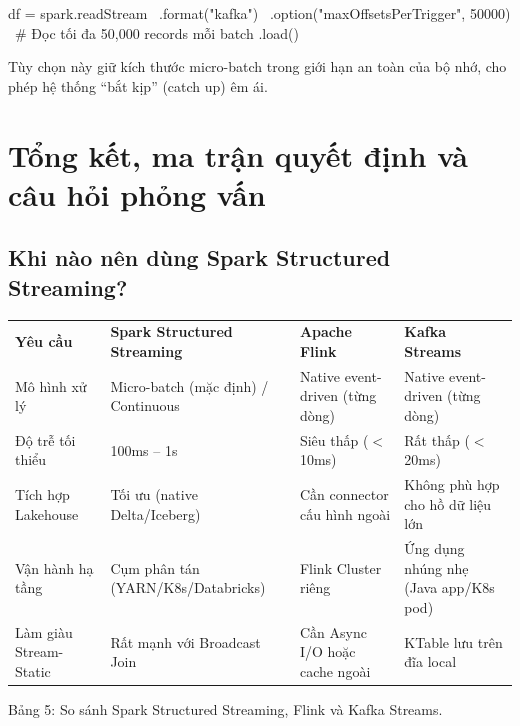 \documentclass[12pt]{article}
\begin{document}
\begin{aivnpybox}[maxOffsetsPerTrigger]
df = spark.readStream \
    .format("kafka") \
    .option("maxOffsetsPerTrigger", 50000) \  # Đọc tối đa 50,000 records mỗi batch
    .load()
\end{aivnpybox}

Tùy chọn này giữ kích thước micro-batch trong giới hạn an toàn của bộ nhớ, cho phép hệ thống ``bắt kịp'' (catch up) êm ái.

\section{Tổng kết, ma trận quyết định và câu hỏi phỏng vấn}

\subsection{Khi nào nên dùng Spark Structured Streaming?}

\noindent
\begin{longtable}{@{}>{\RaggedRight\arraybackslash}p{3.0cm}>{\RaggedRight\arraybackslash}p{4.4cm}>{\RaggedRight\arraybackslash}p{4.0cm}>{\RaggedRight\arraybackslash}p{4.2cm}@{}}
\rowcolor{rowLavender}
\textbf{Yêu cầu} & \textbf{Spark Structured Streaming} & \textbf{Apache Flink} & \textbf{Kafka Streams} \\
\addlinespace[3pt]
\endhead
Mô hình xử lý & Micro-batch (mặc định) / Continuous & Native event-driven (từng dòng) & Native event-driven (từng dòng) \\
\addlinespace[3pt]
Độ trễ tối thiểu & 100ms -- 1s & Siêu thấp ($<$ 10ms) & Rất thấp ($<$ 20ms) \\
\addlinespace[3pt]
Tích hợp Lakehouse & Tối ưu (native Delta/Iceberg) & Cần connector cấu hình ngoài & Không phù hợp cho hồ dữ liệu lớn \\
\addlinespace[3pt]
Vận hành hạ tầng & Cụm phân tán (YARN/K8s/Databricks) & Flink Cluster riêng & Ứng dụng nhúng nhẹ (Java app/K8s pod) \\
\addlinespace[3pt]
Làm giàu Stream-Static & Rất mạnh với Broadcast Join & Cần Async I/O hoặc cache ngoài & KTable lưu trên đĩa local \\
\end{longtable}

\begin{captionbelowboxaivn}
Bảng 5: So sánh Spark Structured Streaming, Flink và Kafka Streams.
\end{captionbelowboxaivn}
\end{document}
